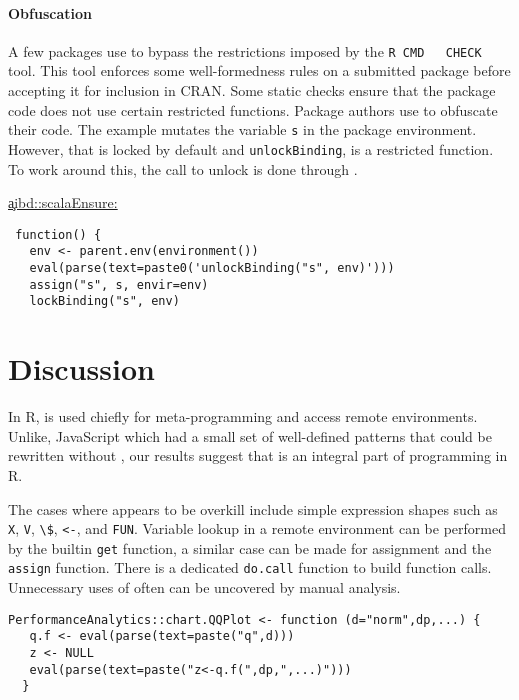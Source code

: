 \documentclass[screen,acmsmall]{acmart}%
\renewcommand{\k}[1]{\lstinline |#1|\xspace}
\begin{document}
\paragraph{Obfuscation}
A few packages use \eval to bypass the restrictions imposed by the \k{R CMD
  CHECK} tool. This tool enforces some well-formedness rules on a submitted
package before accepting it for inclusion in CRAN. Some static checks ensure
that the package code does not use certain restricted functions. Package authors
use \eval to obfuscate their code. The example mutates the variable \k{s} in
the package environment. However, that is locked by default and
\k{unlockBinding}, is a restricted function. To work around this, the call to
unlock is done through \eval.

\begin{minipage}{.95\textwidth}
  \medskip\underline{\c{aibd::scalaEnsure}:}
\begin{lstlisting}
 function() {
   env <- parent.env(environment())
   eval(parse(text=paste0('unlockBinding("s", env)')))
   assign("s", s, envir=env)
   lockBinding("s", env)
\end{lstlisting}\medskip
\end{minipage}

\section{Discussion}


In R, \eval is used chiefly for meta-programming and access remote environments.
Unlike, JavaScript which had a small set of well-defined patterns that could be
rewritten without \eval, our results suggest that \eval is an integral part of
programming in R.

The cases where \eval appears to be overkill include simple expression shapes
such as \k{X}, \k{V}, \k{\$}, \k{<-}, and \k{FUN}. Variable lookup in a remote
environment can be performed by the builtin \k{get} function, a similar case
can be made for assignment and the \k{assign} function. There is a dedicated
\k{do.call} function to build function calls. Unnecessary uses of \eval
often can be uncovered by manual analysis.

\begin{lstlisting}
PerformanceAnalytics::chart.QQPlot <- function (d="norm",dp,...) {
   q.f <- eval(parse(text=paste("q",d)))
   z <- NULL
   eval(parse(text=paste("z<-q.f(",dp,",...)")))
  }
\end{lstlisting}
\end{document}
